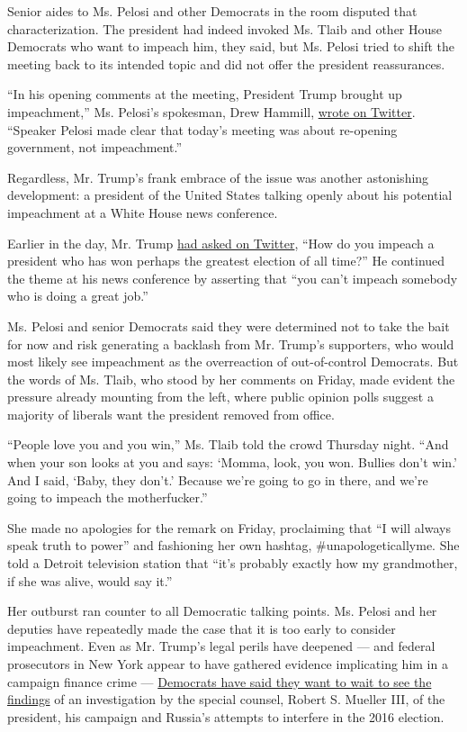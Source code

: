 Senior aides to Ms. Pelosi and other Democrats in the room disputed that
characterization. The president had indeed invoked Ms. Tlaib and other
House Democrats who want to impeach him, they said, but Ms. Pelosi tried
to shift the meeting back to its intended topic and did not offer the
president reassurances.

``In his opening comments at the meeting, President Trump brought up
impeachment,'' Ms. Pelosi's spokesman, Drew Hammill,
\href{https://twitter.com/Drew_Hammill/status/1081283127451049985}{wrote
on Twitter}. ``Speaker Pelosi made clear that today's meeting was about
re-opening government, not impeachment.''

Regardless, Mr. Trump's frank embrace of the issue was another
astonishing development: a president of the United States talking openly
about his potential impeachment at a White House news conference.

Earlier in the day, Mr. Trump
\href{https://twitter.com/realDonaldTrump/status/1081177511592108032}{had
asked on Twitter}, ``How do you impeach a president who has won perhaps
the greatest election of all time?'' He continued the theme at his news
conference by asserting that ``you can't impeach somebody who is doing a
great job.''

Ms. Pelosi and senior Democrats said they were determined not to take
the bait for now and risk generating a backlash from Mr. Trump's
supporters, who would most likely see impeachment as the overreaction of
out-of-control Democrats. But the words of Ms. Tlaib, who stood by her
comments on Friday, made evident the pressure already mounting from the
left, where public opinion polls suggest a majority of liberals want the
president removed from office.

``People love you and you win,'' Ms. Tlaib told the crowd Thursday
night. ``And when your son looks at you and says: `Momma, look, you won.
Bullies don't win.' And I said, `Baby, they don't.' Because we're going
to go in there, and we're going to impeach the motherfucker.''

She made no apologies for the remark on Friday, proclaiming that ``I
will always speak truth to power'' and fashioning her own hashtag,
\#unapologeticallyme. She told a Detroit television station that ``it's
probably exactly how my grandmother, if she was alive, would say it.''

Her outburst ran counter to all Democratic talking points. Ms. Pelosi
and her deputies have repeatedly made the case that it is too early to
consider impeachment. Even as Mr. Trump's legal perils have deepened ---
and federal prosecutors in New York appear to have gathered evidence
implicating him in a campaign finance crime ---
\href{https://www.nytimes.com/2018/11/30/us/politics/jerrold-nadler-trump-impeachment.html}{Democrats
have said they want to wait to see the findings} of an investigation by
the special counsel, Robert S. Mueller III, of the president, his
campaign and Russia's attempts to interfere in the 2016 election.

